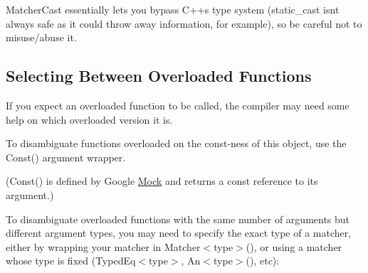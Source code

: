 {\ttfamily Matcher\+Cast} essentially lets you bypass C++\textquotesingle{}s type system ({\ttfamily static\+\_\+cast} isn\textquotesingle{}t always safe as it could throw away information, for example), so be careful not to misuse/abuse it.

\subsection*{Selecting Between Overloaded Functions}

If you expect an overloaded function to be called, the compiler may need some help on which overloaded version it is.

To disambiguate functions overloaded on the const-\/ness of this object, use the {\ttfamily Const()} argument wrapper.


\begin{DoxyCode}{0}
\DoxyCodeLine{}
\DoxyCodeLine{\};}
\DoxyCodeLine{}
\end{DoxyCode}


({\ttfamily Const()} is defined by Google \mbox{\hyperlink{classMock}{Mock}} and returns a {\ttfamily const} reference to its argument.)

To disambiguate overloaded functions with the same number of arguments but different argument types, you may need to specify the exact type of a matcher, either by wrapping your matcher in {\ttfamily Matcher$<$type$>$()}, or using a matcher whose type is fixed ({\ttfamily Typed\+Eq$<$type$>$}, {\ttfamily An$<$type$>$()}, etc)\+:


\begin{DoxyCode}{0}
\DoxyCodeLine{}
\DoxyCodeLine{\};}
\DoxyCodeLine{}
\DoxyCodeLine{}
\DoxyCodeLine{}
\DoxyCodeLine{\}}
\end{DoxyCode}


